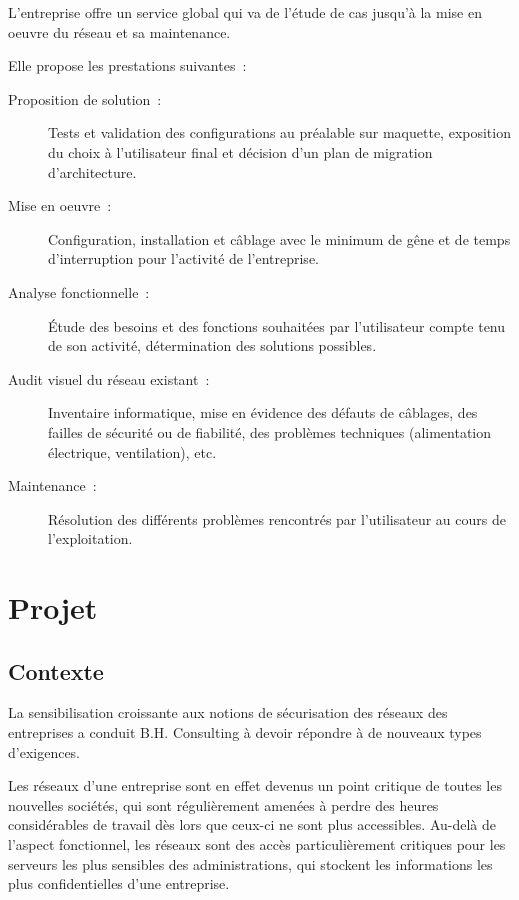 L’entreprise offre un service global qui va de l’étude de cas jusqu’à la mise en oeuvre du réseau et sa maintenance.

Elle propose les prestations suivantes~:

\begin{description}
\item[Proposition de solution~:] Tests et validation des configurations au préalable sur maquette, exposition du choix à l’utilisateur final et décision d’un plan de migration d’architecture.
\item[Mise en oeuvre~:] Configuration, installation et câblage avec le minimum de gêne et de temps d’interruption pour l’activité de l’entreprise.
\item[Analyse fonctionnelle~:] Étude des besoins et des fonctions souhaitées par l’utilisateur compte tenu de son activité, détermination des solutions possibles.
\item[Audit visuel du réseau existant~:] Inventaire informatique, mise en évidence des défauts de câblages, des failles de sécurité ou de fiabilité, des problèmes techniques (alimentation électrique, ventilation), etc.
\item[Maintenance~:] Résolution des différents problèmes rencontrés par l’utilisateur au cours de l’exploitation.
\end{description}

\section{Projet}
\subsection{Contexte}

La sensibilisation croissante aux notions de sécurisation des réseaux des entreprises a conduit B.H. Consulting à devoir répondre à de nouveaux types d'exigences.

Les réseaux d'une entreprise sont en effet devenus un point critique de toutes les nouvelles sociétés, qui sont régulièrement amenées à perdre des heures considérables de travail dès lors que ceux-ci ne sont plus accessibles. Au-delà de l'aspect fonctionnel, les réseaux sont des accès particulièrement critiques pour les serveurs les plus sensibles des administrations, qui stockent les informations les plus confidentielles d'une entreprise.

